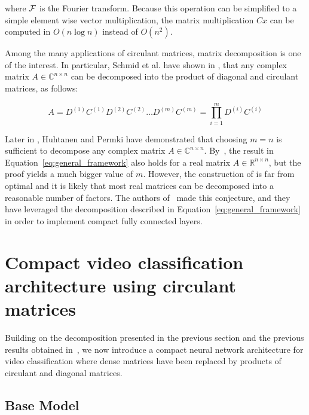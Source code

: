 \documentclass[runningheads]{llncs}
\newcommand{\F}{{\ensuremath \mathcal F}}
\begin{document}
\noindent where $\F$ is the Fourier transform. Because this operation can be simplified to a simple element wise vector multiplication, the matrix multiplication $Cx$ can be computed in $O(n \log n)$ instead of $O(n^2)$.

Among the many applications of circulant matrices, matrix decomposition is one of the interest. In particular, Schmid et al. have shown in \cite{muller1998algorithmic,schmid2000decomposing}, that any complex matrix $A \in \mathbb C^{n\times n}$ can be decomposed into the product of diagonal and circulant matrices, as follows:

\begin{equation}\label{eq:general_framework}
  A = D^{(1)} C^{(1)} D^{(2)} C^{(2)} \dots D^{(m)} C^{(m)} = \prod_{i=1}^{m} D^{(i)} C^{(i)}
\end{equation}

Later in \cite{Huhtanen2015}, Huhtanen and Permki have demonstrated that choosing $m=n$ is sufficient to decompose  %
any complex matrix $A \in \mathbb C^{n\times n}$. %
By~\cite{schmid2000decomposing}, the result in Equation~\ref{eq:general_framework} also holds for a real matrix $A \in \mathbb R^{n\times n}$, but the proof yields a much bigger value of $m$. However,  the construction of \cite{schmid2000decomposing} is far from optimal and it is likely that most real matrices can be decomposed into a reasonable number of factors. The authors of~\cite{moczulski2015acdc} made this conjecture, and they have leveraged the decomposition described in Equation~\ref{eq:general_framework} in order to implement compact fully connected layers.


\section{Compact  video classification architecture using circulant matrices}
\label{section:archi}

Building on the decomposition presented in the previous section and the previous results obtained in~\cite{moczulski2015acdc}, we now introduce a compact neural network architecture for video classification where dense matrices have been replaced by products of circulant and diagonal matrices.


\subsection{Base Model}
\end{document}
